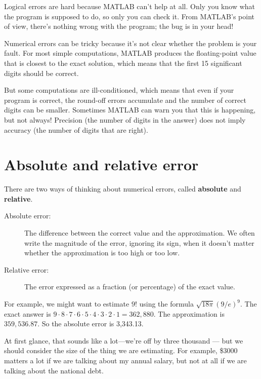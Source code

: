 \documentclass[main.tex]{subfiles}
\begin{document}
Logical errors are hard because MATLAB can't help at all.  Only you
know what the program is supposed to do, so only you can check it.
From MATLAB's point of view, there's nothing wrong with the program;
the bug is in your head!


Numerical errors can be tricky because it's not clear whether the
problem is your fault.  For most simple computations, MATLAB produces
the floating-point value that is closest to the exact solution, which
means that the first 15 significant digits should be correct.  

But some computations are ill-conditioned, which means that even if your program is correct, the round-off errors accumulate and the number of correct digits can be smaller.  Sometimes MATLAB can warn you that
this is happening, but not always!  Precision (the number of digits
in the answer) does not imply accuracy (the number of digits that
are right).


\section{Absolute and relative error}

There are two ways of thinking about numerical errors, called {\bf
absolute} and {\bf relative}.


\begin{description}

\item[Absolute error:] The difference between the correct value and
the approximation.  We often write the magnitude of the error,
ignoring its sign, when it doesn't matter whether the approximation
is too high or too low.

\item[Relative error:] The error expressed as a fraction (or percentage)
of the exact value.
\end{description}

For example, we might want to estimate $9!$ using the formula $\sqrt
{18 \pi} ( 9 / e)^9$.  The exact answer is $9 \cdot 8 \cdot 7 \cdot 6
\cdot 5 \cdot 4 \cdot 3 \cdot 2 \cdot 1 = 362,880$.  The approximation
is $359,536.87$.  So the absolute error is 3,343.13.

At first glance, that sounds like a lot---we're off by three
thousand --- but we should consider the size of the
thing we are estimating.  For example, \$3000 matters a lot
if we are talking about my annual salary, but not at all if we
are talking about the national debt.
\end{document}
